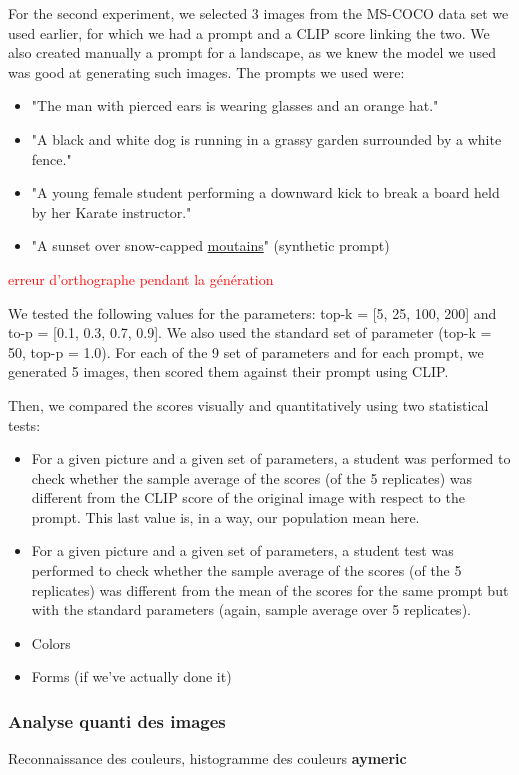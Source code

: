 \documentclass{article}
\begin{document}
For the second experiment, we selected 3 images from the MS-COCO data set we used earlier, for which we had a prompt and a CLIP score linking the two. We also created manually a prompt for a landscape, as we knew the model we used was good at generating such images. The prompts we used were:
\begin{itemize}
    \item "The man with pierced ears is wearing glasses and an orange hat."
    \item "A black and white dog is running in a grassy garden surrounded by a white fence."
    \item "A young female student performing a downward kick to break a board held by her Karate instructor."
    \item "A sunset over snow-capped \underline{moutains}" (synthetic prompt)
\end{itemize}
\textcolor{red}{erreur d'orthographe pendant la génération}

We tested the following values for the parameters: top-k = [5, 25, 100, 200] and to-p = [0.1, 0.3, 0.7, 0.9]. We also used the standard set of parameter (top-k = 50, top-p = 1.0). For each of the 9 set of parameters and for each prompt, we generated 5 images, then scored them against their prompt using CLIP.

Then, we compared the scores visually and quantitatively using two statistical tests:
\begin{itemize}
    \item For a given picture and a given set of parameters, a student was performed to check whether the sample average of the scores (of the 5 replicates) was different from the CLIP score of the original image with respect to the prompt. This last value is, in a way, our population mean here. 
    \item For a given picture and a given set of parameters, a student test was performed to check whether the sample average of the scores (of the 5 replicates) was different from the mean of the scores for the same prompt but with the standard parameters (again, sample average over 5 replicates). 
\end{itemize}

\begin{itemize}
    \item Colors
    \item Forms (if we've actually done it)
\end{itemize}

\subsubsection{Analyse quanti des images}
Reconnaissance des couleurs, histogramme des couleurs
\textbf{aymeric}
\end{document}
